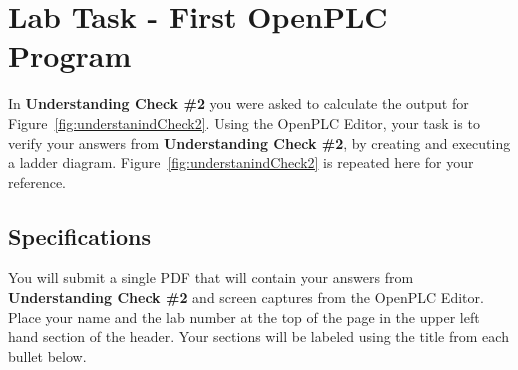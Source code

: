 \section{Lab Task - First OpenPLC Program}
In \textbf{Understanding Check \#2} you were asked to calculate the output for Figure~\ref{fig:understanindCheck2}. Using the OpenPLC Editor, your task is to verify your answers from \textbf{Understanding Check \#2}, by creating and executing a ladder diagram. Figure~\ref{fig:understanindCheck2} is repeated here for your reference.

\begin{figure}[!thb]
\begin{center}
\end{center}
\end{figure}

\subsection{Specifications}
You will submit a single PDF that will contain your answers from \textbf{Understanding Check \#2} and screen captures from the OpenPLC Editor. Place your name and the lab number at the top of the page in the upper left hand section of the header. Your sections will be labeled using the title from each bullet below.

